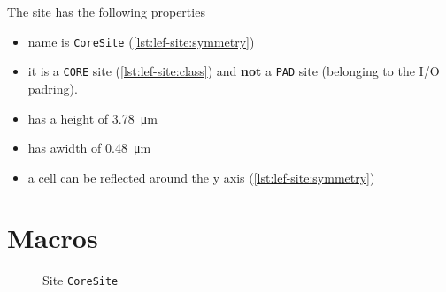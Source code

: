 \documentclass{article}[11pt]
\begin{document}
The site has the following properties
\begin{itemize}
  \item name is \texttt{CoreSite} (\cref{lst:lef-site:symmetry})
  \item it is a \texttt{CORE} site (\cref{lst:lef-site:class}) and \textbf{not}
    a \texttt{PAD} site (belonging to the I/O padring).
  \item has a height of \SI{3.78}{\micro\meter}
  \item has awidth of \SI{0.48}{\micro\meter}
  \item a cell can be reflected around the y axis 
    (\cref{lst:lef-site:symmetry})
\end{itemize}

\section{Macros}

\begin{figure}[H]
  \centering
  \caption{Site \texttt{CoreSite}}
  \label{fig:coresite}
\end{figure}
\end{document}
